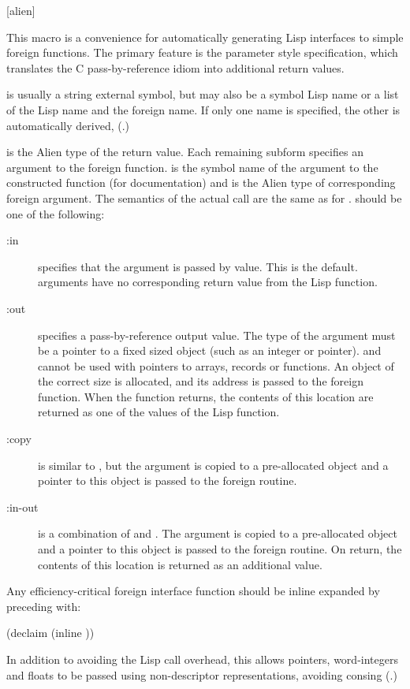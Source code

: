 {[alien]{ 
                         }

This macro is a convenience for automatically generating Lisp interfaces to
simple foreign functions.  The primary feature is the parameter style
specification, which translates the C pass-by-reference idiom into additional
return values.

 is usually a string external symbol, but may also be a symbol Lisp
name or a list of the Lisp name and the foreign name.  If only one name is
specified, the other is automatically derived,
(.)

 is the Alien type of the return value.  Each remaining
subform specifies an argument to the foreign function.   is the
symbol name of the argument to the constructed function (for documentation)
and  is the Alien type of corresponding foreign argument.  The
semantics of the actual call are the same as for .
 should be one of the following:
\begin{description}
\item[:in] specifies that the argument is passed by value.  This is the
default.   arguments have no corresponding return value from the Lisp
function.

\item[:out] specifies a pass-by-reference output value.  The type of the
argument must be a pointer to a fixed sized object (such as an integer or
pointer).   and  cannot be used with pointers to arrays,
records or functions.  An object of the correct size is allocated, and its
address is passed to the foreign function.  When the function returns, the
contents of this location are returned as one of the values of the Lisp
function. 

\item[:copy]
is similar to , but the argument is copied to a pre-allocated
object and a pointer to this object is passed to the foreign routine.

\item[:in-out]
is a combination of  and .  The argument is copied to a
pre-allocated object and a pointer to this object is passed to the
foreign routine.  On return, the contents of this location is returned as an
additional value.
\end{description}
Any efficiency-critical foreign interface function should be inline expanded by
preceding  with:
\begin{lisp}
(declaim (inline ))
\end{lisp}
In addition to avoiding the Lisp call overhead, this allows pointers,
word-integers and floats to be passed using non-descriptor representations,
avoiding consing (.)
\enddefmac

}
